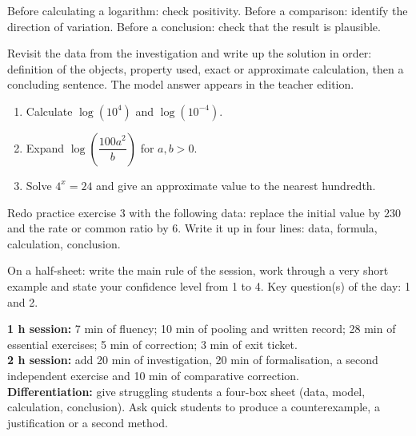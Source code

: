 \begin{traceecrite}Before calculating a logarithm: check positivity. Before a comparison: identify the direction of variation. Before a conclusion: check that the result is plausible.\end{traceecrite}

\begin{exemple}
Revisit the data from the investigation and write up the solution in order: definition of the objects, property used, exact or approximate calculation, then a concluding sentence. The model answer appears in the teacher edition.
\end{exemple}

\begin{exercice}[-- essential]
\begin{enumerate}\item Calculate $\log(10^4)$ and $\log(10^{-4})$.\item Expand $\log\!\left(\dfrac{100a^2}{b}\right)$ for $a,b>0$.\item Solve $4^x=24$ and give an approximate value to the nearest hundredth.\end{enumerate}
\end{exercice}


\begin{dm}Redo practice exercise 3 with the following data: replace the initial value by $230$ and the rate or common ratio by $6$. Write it up in four lines: data, formula, calculation, conclusion.\end{dm}

\begin{sortie}On a half-sheet: write the main rule of the session, work through a very short example and state your confidence level from 1 to 4. Key question(s) of the day: 1 and 2.\end{sortie}

\ifprof
\begin{methode}
\textbf{1 h session:} 7 min of fluency; 10 min of pooling and written record; 28 min of essential exercises; 5 min of correction; 3 min of exit ticket.\\
\textbf{2 h session:} add 20 min of investigation, 20 min of formalisation, a second independent exercise and 10 min of comparative correction.\\
\textbf{Differentiation:} give struggling students a four-box sheet (data, model, calculation, conclusion). Ask quick students to produce a counterexample, a justification or a second method.
\end{methode}
\fi
